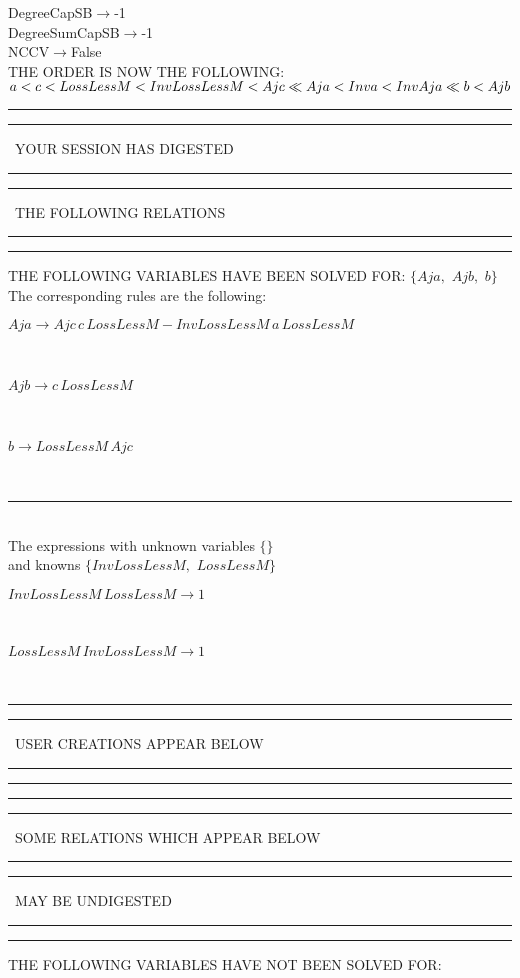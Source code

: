 \documentclass[rep10,leqno]{report}
\begin{document}
DegreeCapSB$\rightarrow $-1\\
DegreeSumCapSB$\rightarrow $-1\\
NCCV$\rightarrow $False\\
THE ORDER IS NOW THE FOLLOWING:\hfil\break
$
a<c<LossLessM<InvLossLessM<Ajc\ll
Aja<Inva<InvAja\ll
b<Ajb\\
$
\rule[2pt]{6in}{4pt}\hfil\break
\rule[2pt]{1.879in}{4pt}
\ YOUR SESSION HAS DIGESTED\ 
\rule[2pt]{1.879in}{4pt}\hfil\break
\rule[2pt]{1.923in}{4pt}
\ THE FOLLOWING RELATIONS\ 
\rule[2pt]{1.923in}{4pt}\hfil\break
\rule[2pt]{6in}{4pt}\hfil\break
THE FOLLOWING VARIABLES HAVE BEEN SOLVED FOR:\hfil\break
$\{Aja,
$ $
Ajb,
$ $
b\}$
\smallskip\\
The corresponding rules are the following:\smallskip\\
\begin{minipage}{6in}
$
Aja\rightarrow Ajc\,
 c\,
 LossLessM - InvLossLessM\,
 a\,
 LossLessM
$
\end{minipage}\medskip\\
\begin{minipage}{6in}
$
Ajb\rightarrow c\,
 LossLessM
$
\end{minipage}\medskip\\
\begin{minipage}{6in}
$
b\rightarrow LossLessM\,
 Ajc
$
\end{minipage}\medskip\\
\rule[3pt]{6in}{.7pt}\\
The expressions with unknown variables $\{\}$\\
and knowns $\{InvLossLessM,
$ $
LossLessM\}$\smallskip\\
\begin{minipage}{6in}
$
InvLossLessM\,
 LossLessM\rightarrow 1
$
\end{minipage}\medskip \\
\begin{minipage}{6in}
$
LossLessM\,
 InvLossLessM\rightarrow 1
$
\end{minipage}\\
\rule[2pt]{6in}{1pt}\hfil\break
\rule[2.5pt]{1.701in}{1pt}
\ USER CREATIONS APPEAR BELOW\ 
\rule[2.5pt]{1.701in}{1pt}\hfil\break
\rule[2pt]{6in}{1pt}\hfil\break
\rule[2pt]{6in}{4pt}\hfil\break
\rule[2pt]{1.45in}{4pt}
\ SOME RELATIONS WHICH APPEAR BELOW\ 
\rule[2pt]{1.45in}{4pt}\hfil\break
\rule[2pt]{2.18in}{4pt}
\ MAY BE UNDIGESTED\ 
\rule[2pt]{2.18in}{4pt}\hfil\break
\rule[2pt]{6in}{4pt}\hfil\break
THE FOLLOWING VARIABLES HAVE NOT BEEN SOLVED FOR:\hfil\break
\end{document}
